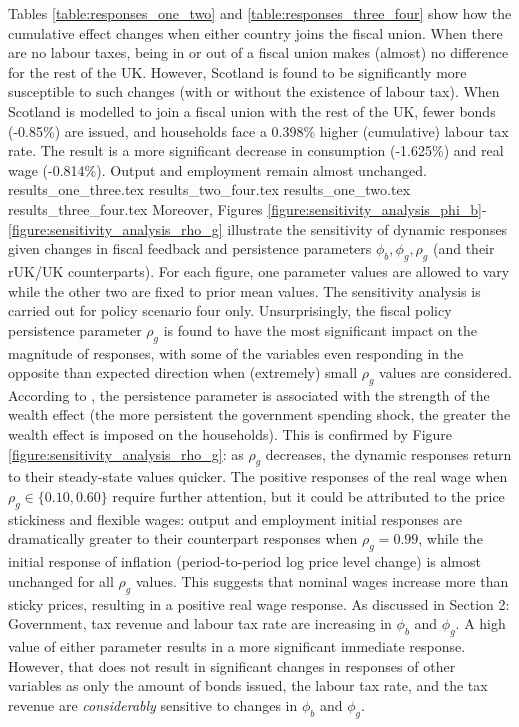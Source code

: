 Tables \ref{table:responses_one_two} and \ref{table:responses_three_four} show how the cumulative effect changes when either country joins the fiscal union. When there are no labour taxes, being in or out of a fiscal union makes (almost) no difference for the rest of the UK. However, Scotland is found to be significantly more susceptible to such changes (with or without the existence of labour tax). When Scotland is modelled to join a fiscal union with the rest of the UK, fewer bonds (-0.85\%) are issued, and households face a 0.398\% higher (cumulative) labour tax rate. The result is a more significant decrease in consumption (-1.625\%) and real wage (-0.814\%). Output and employment remain almost unchanged.
\newpage
{results_one_three.tex}
{results_two_four.tex}
\newpage
{results_one_two.tex}
{results_three_four.tex}
Moreover, Figures \ref{figure:sensitivity_analysis_phi_b}-\ref{figure:sensitivity_analysis_rho_g} illustrate the sensitivity of dynamic responses given changes in fiscal feedback and persistence parameters $\phi_b, \phi_g, \rho_g$ (and their rUK/UK counterparts). For each figure, one parameter values are allowed to vary while the other two are fixed to prior mean values. The sensitivity analysis is carried out for policy scenario four only. Unsurprisingly, the fiscal policy persistence parameter $\rho_g$ is found to have the most significant impact on the magnitude of responses, with some of the variables even responding in the opposite than expected direction when (extremely) small $\rho_g$ values are considered. According to \textcite[27]{jordigal_2005_understanding}, the persistence parameter is associated with the strength of the wealth effect (the more persistent the government spending shock, the greater the wealth effect is imposed on the households). This is confirmed by Figure \ref{figure:sensitivity_analysis_rho_g}: as $\rho_g$ decreases, the dynamic responses return to their steady-state values quicker. The positive responses of the real wage when $\rho_g \in \{ 0.10, 0.60 \}$ require further attention, but it could be attributed to the price stickiness and flexible wages: output and employment initial responses are dramatically greater to their counterpart responses when $\rho_g = 0.99$, while the initial response of inflation (period-to-period log price level change) is almost unchanged for all $\rho_g$ values. This suggests that nominal wages increase more than sticky prices, resulting in a positive real wage response. As discussed in Section 2: Government, tax revenue and labour tax rate are increasing in $\phi_b$ and $\phi_g$. A high value of either parameter results in a more significant immediate response. However, that does not result in significant changes in responses of other variables as only the amount of bonds issued, the labour tax rate, and the tax revenue are \textit{considerably} sensitive to changes in $\phi_b$ and $\phi_g$.
